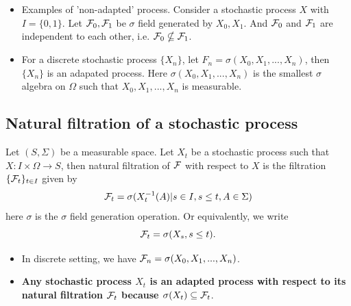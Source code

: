 \begin{refsection}
\begin{remark}\cite{williams1991probability}\hfill
\begin{itemize}
    \item Examples of 'non-adapted' process. Consider a stochastic process $X$ with $I=\{0,1\}$. Let $\mathcal{F}_0,\mathcal{F}_1$ be $\sigma$ field generated by $X_0,X_1$. And $\mathcal{F}_0$ and $\mathcal{F}_1$ are independent to each other, i.e. $\mathcal{F}_0 \nsubseteq \mathcal{F}_1$.
    \item For a discrete stochastic process $\{X_n\}$, let $F_n = \sigma(X_0,X_1,...,X_n)$, then $\{X_n\}$ is an adapated process. Here $\sigma(X_0,X_1,...,X_n)$ is the smallest $\sigma$ algebra on $\Omega$ such that $X_0,X_1,...,X_n$ is measurable.
\end{itemize}
\end{remark}


\begin{remark}
	
\end{remark}

\subsection{Natural filtration of a stochastic process}
\begin{definition}\label{ch:theory-of-stochastic-process:def:NaturalFiltrationGeneratedByStochasticProcesses}
Let $(S,\Sigma)$ be a measurable space. Let $X_t$ be a stochastic process such that $X:I\times\Omega \rightarrow S$, then natural filtration of $\mathcal{F}$ with respect to $X$ is the filtration $\{\mathcal{F}_t\}_{t\in I}$ given by
$$\mathcal{F}_t = \sigma(X^{-1}_t(A)|s\in I,s \leq t, A \in \Sigma)$$
here $\sigma$ is the $\sigma$ field generation operation.
Or equivalently, we write
$$\mathcal{F}_t = \sigma(X_s,s\leq t).$$	
\end{definition}

\begin{remark}\hfill
	\begin{itemize}
		\item In discrete setting, we have $\mathcal{F}_n = \sigma(X_0,X_1,...,X_n)$.
		\item \textbf{Any stochastic process $X_t$ is an adapted process with respect to its natural filtration $\mathcal{F}_t$ because $\sigma(X_t)\subseteq \mathcal{F}_t$}.
	\end{itemize}
\end{remark}


\end{refsection}
